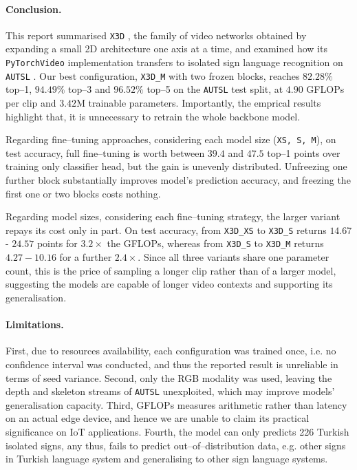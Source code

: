 \label{sec:conclusion}

\paragraph{Conclusion.}
This report summarised \texttt{X3D} \cite{feichtenhofer2020x3d}, the family of video networks obtained by expanding a small 2D architecture one axis at a time, and examined how its \texttt{PyTorchVideo} implementation \cite{fan2021pytorchvideo} transfers to isolated sign language recognition on \texttt{AUTSL} \cite{sincan2020autsl}.
Our best configuration, \texttt{X3D\_M} with two frozen blocks, reaches $82.28\%$ top--1, $94.49\%$ top--3 and $96.52\%$ top--5 on the \texttt{AUTSL} test split, at $4.90$ GFLOPs per clip and $3.42$M trainable parameters.
Importantly, the emprical results highlight that, it is unnecessary to retrain the whole backbone model.

Regarding fine–tuning approaches, considering each model size (\texttt{XS, S, M}), on test accuracy, full fine–tuning is worth between $39.4$ and $47.5$ top–1 points over training only classifier head, but the gain is unevenly distributed.
Unfreezing one further block substantially improves model's prediction accuracy, and freezing the first one or two blocks costs nothing.

Regarding model sizes, considering each fine–tuning strategy, the larger variant repays its cost only in part.
On test accuracy, from \texttt{X3D\_XS} to \texttt{X3D\_S} returns $14.67$ - $24.57$ points for $3.2\times$ the GFLOPs, whereas from \texttt{X3D\_S} to \texttt{X3D\_M} returns $4.27 - 10.16$ for a further $2.4\times$.
Since all three variants share one parameter count, this is the price of sampling a longer clip rather than of a larger model, suggesting the models are capable of longer video contexts and supporting its generalisation.

\paragraph{Limitations.}
First, due to resources availability, each configuration was trained once, i.e. no confidence interval was conducted, and thus the reported result is unreliable in terms of seed variance.
Second, only the RGB modality was used, leaving the depth and skeleton streams of \texttt{AUTSL} unexploited, which may improve models' generalisation capacity.
Third, GFLOPs measures arithmetic rather than latency on an actual edge device, and hence we are unable to claim its practical significance on IoT applications.
Fourth, the model can only predicts 226 Turkish isolated signs, any thus, fails to predict out–of–distribution data, e.g. other signs in Turkish language system and generalising to other sign language systems.

